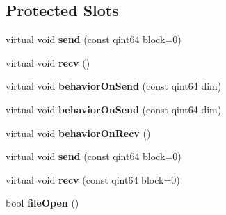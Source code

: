 \subsection*{Protected Slots}
\begin{DoxyCompactItemize}
\item 
\hypertarget{class_k_cloud_1_1_resource_a3084fc9b2fb3f62637bb63e3f3e22915}{virtual void {\bfseries send} (const qint64 block=0)}\label{class_k_cloud_1_1_resource_a3084fc9b2fb3f62637bb63e3f3e22915}

\item 
\hypertarget{class_k_cloud_1_1_resource_a1c47f6808a43c451c700f0f4384f9e92}{virtual void {\bfseries recv} ()}\label{class_k_cloud_1_1_resource_a1c47f6808a43c451c700f0f4384f9e92}

\item 
\hypertarget{class_k_cloud_1_1_resource_ae2c7297f55bf8367b215e216db334a62}{virtual void {\bfseries behavior\-On\-Send} (const qint64 dim)}\label{class_k_cloud_1_1_resource_ae2c7297f55bf8367b215e216db334a62}

\item 
\hypertarget{class_k_cloud_1_1_resource_ae2c7297f55bf8367b215e216db334a62}{virtual void {\bfseries behavior\-On\-Send} (const qint64 dim)}\label{class_k_cloud_1_1_resource_ae2c7297f55bf8367b215e216db334a62}

\item 
\hypertarget{class_k_cloud_1_1_resource_a3be60497d037ff3e8f7dcc5e5adf887a}{virtual void {\bfseries behavior\-On\-Recv} ()}\label{class_k_cloud_1_1_resource_a3be60497d037ff3e8f7dcc5e5adf887a}

\item 
\hypertarget{class_k_cloud_1_1_resource_a3084fc9b2fb3f62637bb63e3f3e22915}{virtual void {\bfseries send} (const qint64 block=0)}\label{class_k_cloud_1_1_resource_a3084fc9b2fb3f62637bb63e3f3e22915}

\item 
\hypertarget{class_k_cloud_1_1_resource_a7b2b762b4252d4e05c7d103401c2dffb}{virtual void {\bfseries recv} (const qint64 block=0)}\label{class_k_cloud_1_1_resource_a7b2b762b4252d4e05c7d103401c2dffb}

\item 
\hypertarget{class_k_cloud_1_1_resource_ad2d1eb72457fdddda166679b7c9f7ef1}{bool {\bfseries file\-Open} ()}\label{class_k_cloud_1_1_resource_ad2d1eb72457fdddda166679b7c9f7ef1}

\end{DoxyCompactItemize}
